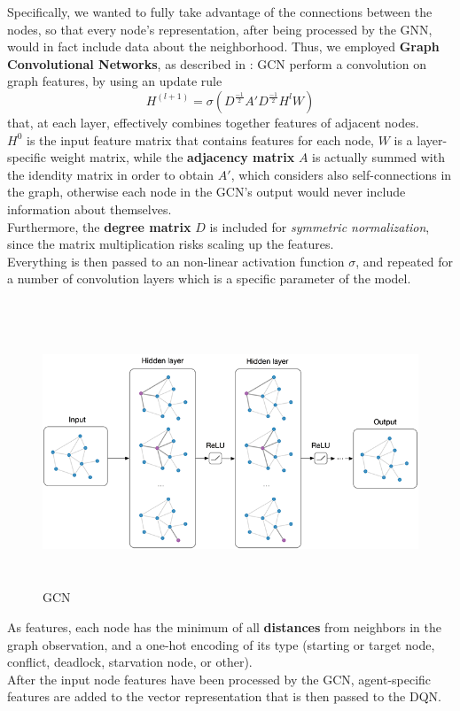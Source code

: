 \noindent
Specifically, we wanted to fully take advantage of the connections between the nodes, so that every node's representation, after being processed by the GNN, would in fact include data about the neighborhood. Thus, we employed \textbf{Graph Convolutional Networks}, as described in \cite{gcn}: GCN perform a convolution on graph features, by using an update rule 
$$H^{(l + 1)} = \sigma(D^{\frac{-1}{2}} A' D^{\frac{-1}{2}} H^{l} W )$$ that, at each layer, effectively combines together features of adjacent nodes.\\ $H^0$ is the input feature matrix that contains features for each node, $W$ is a layer-specific weight matrix, while the \textbf{adjacency matrix} $A$ is actually summed with the idendity matrix in order to obtain $A'$, which considers also self-connections in the graph, otherwise each node in the GCN's output would never include information about themselves. \\
Furthermore, the \textbf{degree matrix} $D$ is included for \textit{symmetric normalization}, since the matrix multiplication risks scaling up the features.\\
Everything is then passed to an non-linear activation function $\sigma$, and repeated for a number of convolution layers which is a specific parameter of the model.\\ \\

\begin{figure}[H] 
\includegraphics[height=80mm, width=140mm, scale=0.5]{chapters/gcn.png}
\centering
\caption{GCN}
\label{fig:s5} 
\end{figure}
\noindent
As features, each node has the minimum of all \textbf{distances} from neighbors in the graph observation, and a one-hot encoding of its type (starting or target node, conflict, deadlock, starvation node, or other). \\
After the input node features have been processed by the GCN, agent-specific features are added to the vector representation that is then passed to the DQN.
